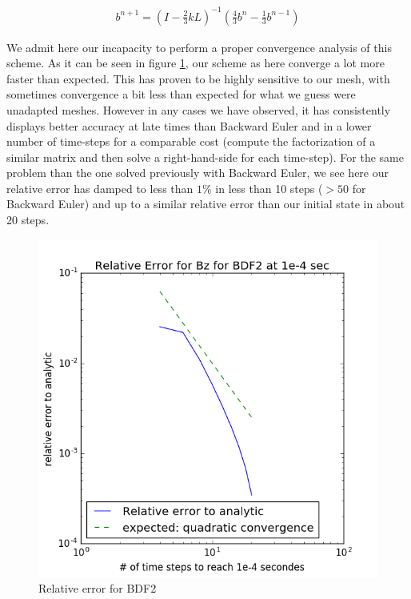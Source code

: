 \documentclass[twoside]{article}
\begin{document}
\begin{align}
b^{n+1}= (I-\frac{2}{3}kL)^{-1}(\frac{4}{3} b^n - \frac{1}{3} b^{n-1})
\end{align}

We admit here our incapacity to perform a proper convergence analysis of this scheme. As it can be seen in figure \ref{Convergence_BDF2}, our scheme as here converge a lot more faster than expected. This has proven to be highly sensitive to our mesh, with sometimes convergence a bit less than expected for what we guess were unadapted meshes.
However in any cases we have observed, it has consistently displays better accuracy at late times than Backward Euler and in a lower number of time-steps for a comparable cost (compute the factorization of a similar matrix and then solve a right-hand-side for each time-step). For the same problem than the one solved previously with Backward Euler, we see here our relative error has damped to less than $1\%$ in less than 10 steps ($>50$ for Backward Euler) and up to a similar relative error than our initial state in about 20 steps. 

\begin{figure}[!ht]
\centering
\includegraphics[scale=0.4]{./figures/BDF2/RelativeError_BDF2_morethanexpected_2.png}
\caption{Relative error for BDF2}
\label{Convergence_BDF2}
\end{figure}
\end{document}

